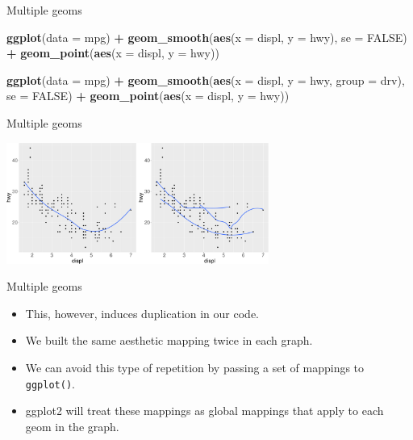 \documentclass[ignorenonframetext,]{beamer}
\newenvironment{Shaded}{\begin{snugshade}}{\end{snugshade}}
\newcommand{\DataTypeTok}[1]{\textcolor[rgb]{0.13,0.29,0.53}{#1}}
\newcommand{\KeywordTok}[1]{\textcolor[rgb]{0.13,0.29,0.53}{\textbf{#1}}}
\newcommand{\NormalTok}[1]{#1}
\newcommand{\OperatorTok}[1]{\textcolor[rgb]{0.81,0.36,0.00}{\textbf{#1}}}
\newcommand{\OtherTok}[1]{\textcolor[rgb]{0.56,0.35,0.01}{#1}}
\newcommand{\StringTok}[1]{\textcolor[rgb]{0.31,0.60,0.02}{#1}}
\begin{document}
\begin{frame}[fragile]{Multiple geoms}
\protect\hypertarget{multiple-geoms-2}{}

\begin{Shaded}
\begin{Highlighting}[]
\KeywordTok{ggplot}\NormalTok{(}\DataTypeTok{data =}\NormalTok{ mpg) }\OperatorTok{+}
\StringTok{  }\KeywordTok{geom_smooth}\NormalTok{(}\KeywordTok{aes}\NormalTok{(}\DataTypeTok{x =}\NormalTok{ displ, }\DataTypeTok{y =}\NormalTok{ hwy), }\DataTypeTok{se =} \OtherTok{FALSE}\NormalTok{) }\OperatorTok{+}
\StringTok{  }\KeywordTok{geom_point}\NormalTok{(}\KeywordTok{aes}\NormalTok{(}\DataTypeTok{x =}\NormalTok{ displ, }\DataTypeTok{y =}\NormalTok{ hwy))}
              
\KeywordTok{ggplot}\NormalTok{(}\DataTypeTok{data =}\NormalTok{ mpg) }\OperatorTok{+}
\StringTok{  }\KeywordTok{geom_smooth}\NormalTok{(}\KeywordTok{aes}\NormalTok{(}\DataTypeTok{x =}\NormalTok{ displ, }\DataTypeTok{y =}\NormalTok{ hwy, }\DataTypeTok{group =}\NormalTok{ drv), }
              \DataTypeTok{se =} \OtherTok{FALSE}\NormalTok{) }\OperatorTok{+}
\StringTok{  }\KeywordTok{geom_point}\NormalTok{(}\KeywordTok{aes}\NormalTok{(}\DataTypeTok{x =}\NormalTok{ displ, }\DataTypeTok{y =}\NormalTok{ hwy))}
\end{Highlighting}
\end{Shaded}

\end{frame}

\begin{frame}{Multiple geoms}
\protect\hypertarget{multiple-geoms-3}{}

\begin{center}\includegraphics[height=150px]{data-visualization_files/figure-beamer/unnamed-chunk-82-1} \end{center}

\end{frame}

\begin{frame}[fragile]{Multiple geoms}
\protect\hypertarget{multiple-geoms-4}{}

\begin{itemize}
\item
  This, however, induces duplication in our code.
\item
  We built the same aesthetic mapping twice in each graph.
\item
  We can avoid this type of repetition by passing a set of mappings to
  \texttt{ggplot()}.
\item
  ggplot2 will treat these mappings as global mappings that apply to
  each geom in the graph.
\end{itemize}

\end{frame}
\end{document}

